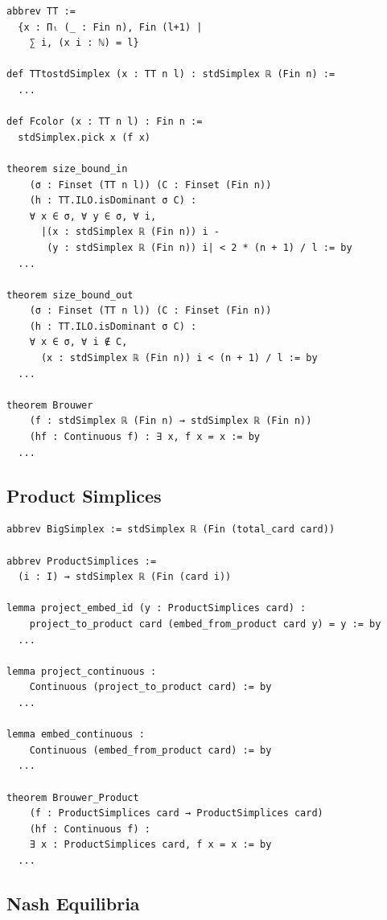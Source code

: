 \documentclass{article}
\theoremstyle{definition}
\begin{document}
\begin{lstlisting}[caption={Representative interfaces for the grid construction and Brouwer endpoint.},label={lst:app-brouwer-interface}]
abbrev TT :=
  {x : Πₗ (_ : Fin n), Fin (l+1) |
    ∑ i, (x i : ℕ) = l}

def TTtostdSimplex (x : TT n l) : stdSimplex ℝ (Fin n) :=
  ...

def Fcolor (x : TT n l) : Fin n :=
  stdSimplex.pick x (f x)

theorem size_bound_in
    (σ : Finset (TT n l)) (C : Finset (Fin n))
    (h : TT.ILO.isDominant σ C) :
    ∀ x ∈ σ, ∀ y ∈ σ, ∀ i,
      |(x : stdSimplex ℝ (Fin n)) i -
       (y : stdSimplex ℝ (Fin n)) i| < 2 * (n + 1) / l := by
  ...

theorem size_bound_out
    (σ : Finset (TT n l)) (C : Finset (Fin n))
    (h : TT.ILO.isDominant σ C) :
    ∀ x ∈ σ, ∀ i ∉ C,
      (x : stdSimplex ℝ (Fin n)) i < (n + 1) / l := by
  ...

theorem Brouwer
    (f : stdSimplex ℝ (Fin n) → stdSimplex ℝ (Fin n))
    (hf : Continuous f) : ∃ x, f x = x := by
  ...
\end{lstlisting}

\subsection{Product Simplices}

\begin{lstlisting}[caption={Representative interfaces for the embedding--projection reduction.},label={lst:app-product-interface}]
abbrev BigSimplex := stdSimplex ℝ (Fin (total_card card))

abbrev ProductSimplices :=
  (i : I) → stdSimplex ℝ (Fin (card i))

lemma project_embed_id (y : ProductSimplices card) :
    project_to_product card (embed_from_product card y) = y := by
  ...

lemma project_continuous :
    Continuous (project_to_product card) := by
  ...

lemma embed_continuous :
    Continuous (embed_from_product card) := by
  ...

theorem Brouwer_Product
    (f : ProductSimplices card → ProductSimplices card)
    (hf : Continuous f) :
    ∃ x : ProductSimplices card, f x = x := by
  ...
\end{lstlisting}

\clearpage
\subsection{Nash Equilibria}
\end{document}
